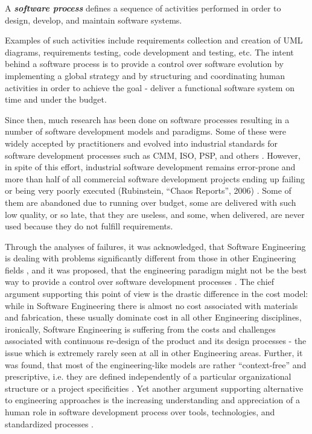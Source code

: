 \begin{defn}\label{def_process}
A \textbf{\textit{software process}} defines a sequence of activities performed in order 
to design, develop, and maintain software systems.
\end{defn}
Examples of such activities include requirements collection and creation of UML diagrams, 
requirements testing, code development and testing, etc. The intent behind a software process is 
to provide a control over software evolution by implementing a global strategy and by structuring
and coordinating human activities in order to achieve the goal - deliver a functional software system 
on time and under the budget. 

Since then, much research has been done on software processes resulting in a number
of software development models and paradigms. Some of these were widely accepted by practitioners 
and evolved into industrial standards for software development processes such as CMM, ISO, PSP, 
and others \cite{citeulike:5043104}. However, in spite of this effort, industrial software 
development remains error-prone and more than half of all 
commercial software development projects ending up failing or being very poorly executed 
(Rubinstein, ``Chaos Reports'', 2006) \cite{chaos2006}. Some of them are abandoned due to running 
over budget, some are delivered with such low quality, or so late, that they are useless, and some, 
when delivered, are never used because they do not fulfill requirements. 

Through the analyses of failures, it was acknowledged, that Software Engineering 
is dealing with problems significantly different from those in other Engineering fields 
\cite{citeulike:2207657}, and it was proposed, that the engineering paradigm might 
not be the best way to provide a control over software development processes 
\cite{citeulike:3729379} \cite{citeulike:5203446}.
The chief argument supporting this point of view is the drastic difference in the cost model:
while in Software Engineering there is almost no cost associated with materials and 
fabrication, these usually dominate cost in all other Engineering disciplines, 
ironically, Software Engineering is suffering from the costs and challenges associated with 
continuous re-design of the product and its design processes - the issue which is 
extremely rarely seen at all in other Engineering areas. 
Further, it was found, that most of the engineering-like models are rather ``context-free''
and prescriptive, i.e. they are defined independently of a particular organizational 
structure or a project specificities \cite{sacchi_2001}.
Yet another argument supporting alternative to engineering approaches is the increasing 
understanding and appreciation of a human role in software development process over tools, 
technologies, and standardized processes \cite{citeulike:6580825} \cite{citeulike:149387}
\cite{1605185} \cite{citeulike:113403} \cite{1605188} \cite{citeulike:12743107}. 

